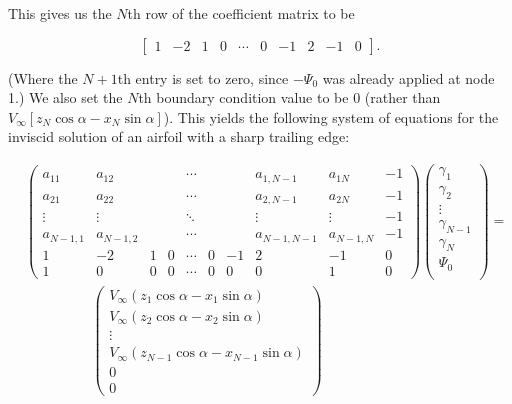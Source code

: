 \documentclass[]{article}
\begin{document}
\noindent This gives us the \(N\)th row of the coefficient matrix to be

\begin{equation}
	\begin{bmatrix}
		1 & -2 & 1 & 0 & \cdots & 0 & -1 & 2 & -1 & 0 
	\end{bmatrix}.
\end{equation}


\noindent (Where the \(N+1\)th entry is set to zero, since \(-\Psi_0\) was already applied at node 1.) We also set the \(N\)th boundary condition value to be 0 (rather than \(V_\infty[z_N\cos\alpha - x_N \sin\alpha]\)). 
This yields the following system of equations for the inviscid solution of an airfoil with a sharp trailing edge:

 \begin{equation}
 	\begin{split}
&	\begin{pmatrix}
		a_{11} & a_{12} & & & \cdots & & & a_{1,N-1} & a_{1N} & -1 \\
		a_{21} & a_{22} & & & \cdots & & & a_{2,N-1} & a_{2N} & -1 \\
		\vdots & \vdots & & & \ddots & & & \vdots & \vdots & -1 \\
		a_{N-1,1} & a_{N-1,2} & & & \cdots & & & a_{N-1,N-1} & a_{N-1,N} & -1 \\
		1 & -2 & 1 & 0 & \cdots & 0 & -1 & 2 & -1 & 0 \\
		1 & 0 & 0 & 0 & \cdots & 0 & 0 & 0 & 1 & 0
	\end{pmatrix}
	\begin{pmatrix}
		\gamma_1 \\
		\gamma_2 \\
		\vdots \\
		\gamma_{N-1} \\
		\gamma_N \\
		\Psi_0 \\
	\end{pmatrix}
	= \\
	& \hspace{2cm}\begin{pmatrix}
		V_\infty(z_1\cos\alpha - x_1 \sin\alpha) \\
		V_\infty(z_2\cos\alpha - x_2 \sin\alpha) \\
		\vdots \\
		V_\infty(z_{N-1}\cos\alpha - x_{N-1} \sin\alpha) \\
		0 \\
		0
	\end{pmatrix}
\end{split}
\end{equation}
\end{document}
